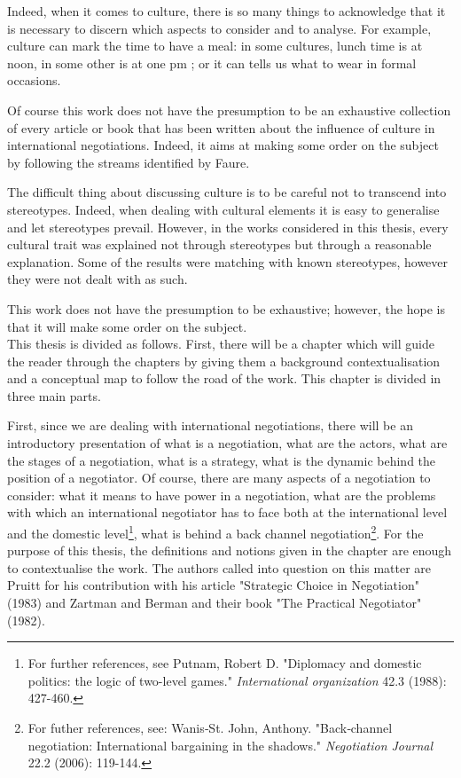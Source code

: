 \documentclass[../main.tex]{subfiles}
\begin{document}
Indeed, when it comes to culture, there is so many things to acknowledge that it is necessary to discern which aspects to consider and to analyse. For example, culture can mark the time to have a meal: in some cultures, lunch time is at noon, in some other is at one pm \autocite[7]{helen}; or it can tells us what to wear in formal occasions.

Of course this work does not have the presumption to be an exhaustive collection of every article or book that has been written about the influence of culture in international negotiations. Indeed, it aims at making some order on the subject by following the streams identified by Faure.

The difficult thing about discussing culture is to be careful not to transcend into stereotypes. Indeed, when dealing with cultural elements it is easy to generalise and let stereotypes prevail. However, in the works considered in this thesis, every cultural trait was explained not through stereotypes but through a reasonable explanation. Some of the results were matching with known stereotypes, however they were not dealt with as such. 

This work does not have the presumption to be exhaustive; however, the hope is that it will make some order on the subject.\\

This thesis is divided as follows. First, there will be a chapter which will guide the reader through the chapters by giving them a background contextualisation and a  conceptual map to follow the road of the work. 
This chapter is divided in three main parts.

First, since we are dealing with international negotiations, there will be an introductory presentation of what is a negotiation, what are the actors, what are the stages of a negotiation, what is a strategy, what is the dynamic behind the position of a negotiator. Of course, there are many aspects of a negotiation to consider: what it means to have power in a negotiation, what are the problems with which an international negotiator has to face both at the international level and the domestic level\footnote{For further references, see Putnam, Robert D. "Diplomacy and domestic politics: the logic of two-level games." \textit{International organization} 42.3 (1988): 427-460.}, what is behind a back channel negotiation\footnote{For futher references, see: Wanis‐St. John, Anthony. "Back‐channel negotiation: International bargaining in the shadows." \textit{Negotiation Journal} 22.2 (2006): 119-144.}.
For the purpose of this thesis, the definitions and notions given in the chapter are enough to contextualise the work.
The authors called into question on this matter are Pruitt for his contribution with his article "Strategic Choice in Negotiation" (1983) and Zartman and Berman and their book "The Practical Negotiator" (1982).
\end{document}
